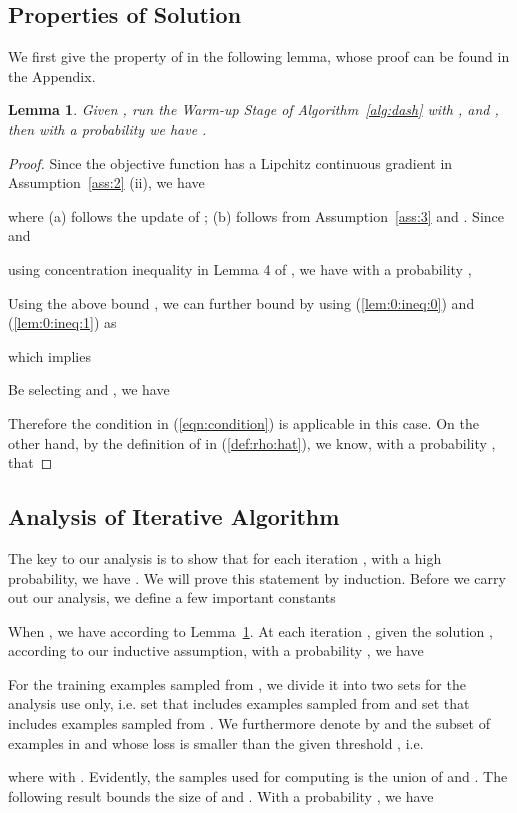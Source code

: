 \documentclass{article}
\newtheorem{lemma}{Lemma}
\begin{document}
\subsection{Properties of Solution }
We first give the property of  in the following lemma, whose proof can be found in the Appendix. 
\begin{lemma}\label{lem:0}
Given , run the Warm-up Stage of Algorithm~\ref{alg:dash} with ,  and , then with a probability  we have
    . 
\end{lemma}
\begin{proof}
Since the objective function  has a Lipchitz continuous gradient in Assumption~\ref{ass:2} (ii), we have

where (a) follows the update of ;  (b) follows from Assumption~\ref{ass:3} and . 
Since  and

using concentration inequality in Lemma 4 of \citep{ghadimi2016mini}, 
we have with a probability ,

Using the above bound , we can further bound  by using (\ref{lem:0:ineq:0}) and (\ref{lem:0:ineq:1}) as

which implies 

Be selecting  and , we have

Therefore the condition in (\ref{eqn:condition}) is applicable in this case. On the other hand, by the definition of  in (\ref{def:rho:hat}), we know, with a probability , that

\end{proof}

\subsection{Analysis of Iterative Algorithm}
The key to our analysis is to show that for each iteration , with a high probability, we have . We will prove this statement by induction.  
Before we carry out our analysis, we define a few important constants

When , we have  according to Lemma~\ref{lem:0}. At each iteration , given the solution , according to our inductive assumption, with a probability , we have

For the  training examples sampled from , we divide it into two sets for the analysis use only, i.e. set  that includes examples sampled from  and set  that includes examples sampled from . We furthermore denote by  and  the subset of examples in  and  whose loss is smaller than the given threshold , i.e.

where  with . Evidently, the samples used for computing  is the union of  and . The following result bounds the size of  and .
With a probability , we have
\end{document}

